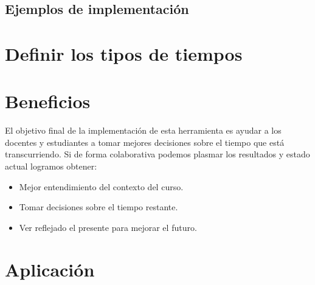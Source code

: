 \subsection{Ejemplos de implementaci\'on}


\section{Definir los tipos de tiempos}

\section{Beneficios}
El objetivo final de la implementaci\'on de esta herramienta es ayudar a los docentes y estudiantes a tomar mejores decisiones sobre el tiempo que est\'a
transcurriendo. Si de forma colaborativa podemos plasmar los resultados y estado actual logramos obtener:
\begin{itemize}
 \item Mejor entendimiento del contexto del curso.
 \item Tomar decisiones sobre el tiempo restante.
 \item Ver reflejado el presente para mejorar el futuro.
\end{itemize}


\section{Aplicaci\'on}